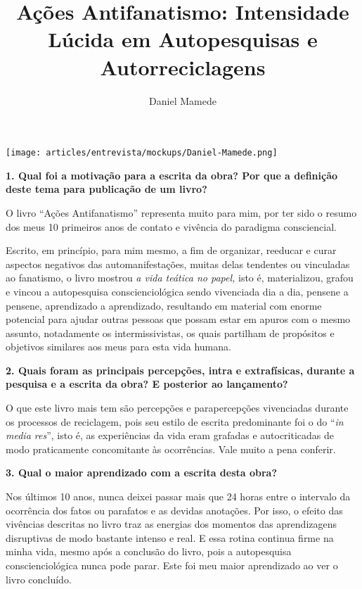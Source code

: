 \documentclass{gescons}
\author{Daniel Mamede}
\title{Ações Antifanatismo: Intensidade Lúcida em Autopesquisas e Autorreciclagens}
\begin{document}
    \makeentrevistatitle

    \begin{multicols}{2}

\begin{center}
    \texttt{[image: articles/entrevista/mockups/Daniel-Mamede.png]}
\end{center}


\textbf{1. Qual foi a motivação para a escrita da obra? Por que a definição deste tema para publicação de um livro?}

O livro “Ações Antifanatismo” representa muito para mim, por ter sido o resumo dos meus 10 primeiros anos de contato e vivência do paradigma consciencial. 

Escrito, em princípio, para mim mesmo, a fim de organizar, reeducar e curar aspectos negativos das automanifestações, muitas delas tendentes ou vinculadas ao fanatismo, o livro mostrou \textit{a vida teática no papel,} isto é, materializou, grafou e vincou a autopesquisa conscienciológica sendo vivenciada dia a dia, pensene a pensene, aprendizado a aprendizado, resultando em material com enorme potencial para ajudar outras pessoas que possam estar em apuros com o mesmo assunto, notadamente os intermissivistas, os quais partilham de propósitos e objetivos similares aos meus para esta vida humana.



\textbf{2. Quais foram as principais percepções, intra e extrafísicas, durante a pesquisa e a escrita da obra? E posterior ao lançamento?}

O que este livro mais tem são percepções e parapercepções vivenciadas durante os processos de reciclagem, pois seu estilo de escrita predominante foi o do “\textit{in media res}”, isto é, as experiências da vida eram grafadas e autocriticadas de modo praticamente concomitante às ocorrências. Vale muito a pena conferir. 


\textbf{3.       Qual o maior aprendizado com a escrita desta obra?}

Nos últimos 10 anos, nunca deixei passar mais que 24 horas entre o intervalo da ocorrência dos fatos ou parafatos e as devidas anotações. Por isso, o efeito das vivências descritas no livro traz as energias dos momentos das aprendizagens disruptivas de modo bastante intenso e real. E essa rotina continua firme na minha vida, mesmo após a conclusão do livro, pois a autopesquisa conscienciológica nunca pode parar. Este foi meu maior aprendizado ao ver o livro concluído.


\end{multicols}
\end{document}

